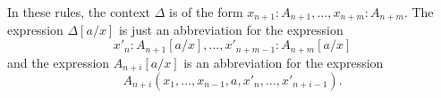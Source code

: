 \noindent
\begin{prooftree}
\end{prooftree}

\noindent
\begin{minipage}{.5\textwidth}
\begin{prooftree}
\end{prooftree}
\end{minipage}\hfill
\begin{minipage}{.5\textwidth}
\begin{prooftree}
\end{prooftree}
\end{minipage}

\bigskip
In these rules, the context $\Delta$ is of the form $x_{n+1}:A_{n+1},\ldots,x_{n+m}:A_{n+m}$.
The expression $\Delta[a/x]$ is just an abbreviation for the expression
\begin{equation*}
x'_n:A_{n+1}[a/x],\ldots,x'_{n+m-1}:A_{n+m}[a/x]
\end{equation*}
and the expression $A_{n+i}[a/x]$ is an abbreviation for the expression
\begin{equation*}
A_{n+i}(x_1,\ldots,x_{n-1},a,x'_n,\ldots,x'_{n+i-1}).
\end{equation*}

